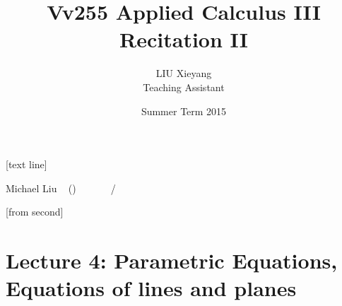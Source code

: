\documentclass[10pt]{beamer}
\begin{document}



[text line]{%
	\color{blue!40!black}\parbox{\linewidth}{\vspace*{-8pt}Michael Liu ~ (\insertshortinstitute)\hfill\insertshorttitle\hfill\insertshortdate~~~~~~\insertframenumber{}~/~\inserttotalframenumber}}


[from second] 

\newcommand{\tabincell}[2]{\begin{tabular}{@{}#1@{}}#2\end{tabular}}


\title[Vv255 Applied Calculus III]{Vv255 Applied Calculus III\\{\small Recitation II}}   
\author[Michael Liu]{LIU Xieyang\\{\tiny Teaching Assistant}} 
\date[Summer 2015]{Summer Term 2015} 
\begin{frame}
	\titlepage
\end{frame}






\section{Lecture 4: Parametric Equations, Equations of lines and planes} 
\end{document}
